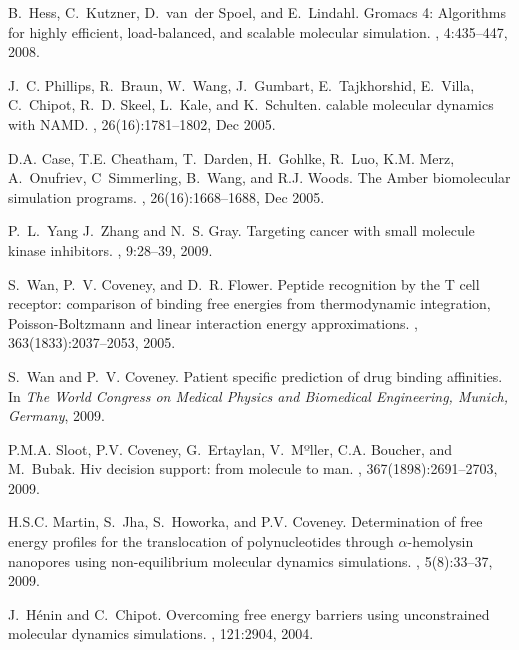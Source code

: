 \begin{thebibliography}{10}
B.~Hess, C.~Kutzner, D.~van~der Spoel, and E.~Lindahl.
\newblock Gromacs 4: Algorithms for highly efficient, load-balanced, and
  scalable molecular simulation.
, 4:435--447, 2008.

J.~C. Phillips, R.~Braun, W.~Wang, J.~Gumbart, E.~Tajkhorshid, E.~Villa,
  C.~Chipot, R.~D. Skeel, L.~Kale, and K.~Schulten.
calable molecular dynamics with {NAMD}.
, 26(16):1781--1802, Dec
  2005.

D.A. Case, T.E. Cheatham, T.~Darden, H.~Gohlke, R.~Luo, K.M. Merz, A.~Onufriev,
  C~Simmerling, B.~Wang, and R.J. Woods.
\newblock The {A}mber biomolecular simulation programs.
, 26(16):1668--1688, Dec 2005.

P.~L.~Yang J.~Zhang and N.~S. Gray.
\newblock Targeting cancer with small molecule kinase inhibitors.
, 9:28--39, 2009.

S.~Wan, P.~V. Coveney, and D.~R. Flower.
\newblock Peptide recognition by the {T} cell receptor: comparison of binding
  free energies from thermodynamic integration, {Poisson-Boltzmann} and linear
  interaction energy approximations.
, 363(1833):2037--2053, 2005.

S.~Wan and P.~V. Coveney.
\newblock Patient specific prediction of drug binding affinities.
\newblock In {\em The World Congress on Medical Physics and Biomedical
  Engineering, Munich, Germany}, 2009.

P.M.A. Sloot, P.V. Coveney, G.~Ertaylan, V.~Mºller, C.A. Boucher, and
  M.~Bubak.
\newblock Hiv decision support: from molecule to man.
, 367(1898):2691--2703, 2009.

H.S.C. Martin, S.~Jha, S.~Howorka, and P.V. Coveney.
\newblock Determination of free energy profiles for the translocation of
  polynucleotides through $\alpha$-hemolysin nanopores using non-equilibrium
  molecular dynamics simulations.
, 5(8):33--37, 2009.

J.~H{\'e}nin and C.~Chipot.
\newblock Overcoming free energy barriers using unconstrained molecular
  dynamics simulations.
, 121:2904, 2004.


\end{thebibliography}

